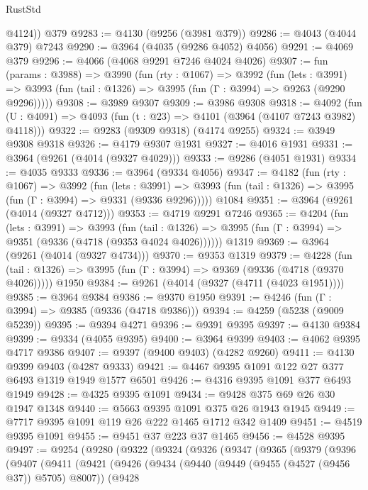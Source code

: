 \begin{lexlean}{RustStd}
\begin{coremodule}
{\begin{coremodule}
{{{{{{{{{{{{{{{{{{{{{{{{{{{{{{{{{{{{{{        @4124))
    @379
@9283 := @4130 (@9256 (@3981 @379))
@9286 := @4043 (@4044 @379) @7243
@9290 := @3964 (@4035 (@9286 @4052) @4056)
@9291 := @4069 @379
@9296 := @4066 (@4068 @9291 @7246 @4024 @4026)
@9307 := fun (params : @3988) =>
  @3990
    (fun (rty : @1067) =>
    @3992
      (fun (lets : @3991) =>
      @3993 (fun (tail : @1326) => @3995 (fun (Γ : @3994) => @9263 (@9290 @9296)))))
@9308 := @3989 @9307
@9309 := @3986 @9308
@9318 := @4092 (fun (U : @4091) => @4093 (fun (t : @23) => @4101 (@3964 (@4107 @7243 @3982) @4118)))
@9322 := @9283 (@9309 @9318) (@4174 @9255)
@9324 := @3949 @9308 @9318
@9326 := @4179 @9307 @1931
@9327 := @4016 @1931
@9331 := @3964 (@9261 (@4014 (@9327 @4029)))
@9333 := @9286 (@4051 @1931)
@9334 := @4035 @9333
@9336 := @3964 (@9334 @4056)
@9347 := @4182
    (fun (rty : @1067) =>
    @3992
      (fun (lets : @3991) =>
      @3993 (fun (tail : @1326) => @3995 (fun (Γ : @3994) => @9331 (@9336 @9296)))))
    @1084
@9351 := @3964 (@9261 (@4014 (@9327 @4712)))
@9353 := @4719 @9291 @7246
@9365 := @4204
    (fun (lets : @3991) =>
    @3993
      (fun (tail : @1326) => @3995 (fun (Γ : @3994) => @9351 (@9336 (@4718 (@9353 @4024 @4026))))))
    @1319
@9369 := @3964 (@9261 (@4014 (@9327 @4734)))
@9370 := @9353 @1319
@9379 := @4228
    (fun (tail : @1326) => @3995 (fun (Γ : @3994) => @9369 (@9336 (@4718 (@9370 @4026)))))
    @1950
@9384 := @9261 (@4014 (@9327 (@4711 (@4023 @1951))))
@9385 := @3964 @9384
@9386 := @9370 @1950
@9391 := @4246 (fun (Γ : @3994) => @9385 (@9336 (@4718 @9386)))
@9394 := @4259 (@5238 (@9009 @5239))
@9395 := @9394 @4271
@9396 := @9391 @9395
@9397 := @4130 @9384
@9399 := @9334 (@4055 @9395)
@9400 := @3964 @9399
@9403 := @4062 @9395 @4717 @9386
@9407 := @9397 (@9400 @9403) (@4282 @9260)
@9411 := @4130 @9399 @9403 (@4287 @9333)
@9421 := @4467 @9395 @1091 @122 @27 @377 @6493 @1319 @1949 @1577 @6501
@9426 := @4316 @9395 @1091 @377 @6493 @1949
@9428 := @4325 @9395 @1091
@9434 := @9428 @375 @69 @26 @30 @1947 @1348
@9440 := @5663 @9395 @1091 @375 @26 @1943 @1945
@9449 := @7717 @9395 @1091 @119 @26 @222 @1465 @1712 @342 @1409
@9451 := @4519 @9395 @1091
@9455 := @9451 @37 @223 @37 @1465
@9456 := @4528 @9395
@9497 := @9254
    (@9280
      (@9322
        (@9324
          (@9326
            (@9347
              (@9365
                (@9379
                  (@9396
                    (@9407
                      (@9411
                        (@9421
                          (@9426
                            (@9434
                              (@9440 (@9449 (@9455 (@4527 (@9456 @37)) @5705) @8007))
                              (@9428
}}}}}}}}}}}}}}}}}}}}}}}}}}}}}}}}}}}}}}
\end{coremodule}}
\end{coremodule}
\end{lexlean}
